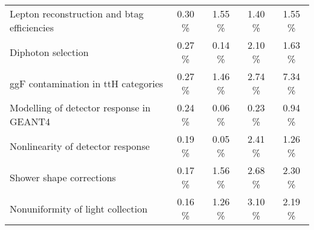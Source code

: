 {\begin{tabular} { |l |  c |  c |  c |  c |  }
    Lepton reconstruction and btag efficiencies  &  0.30 \% &  1.55 \% &  1.40 \% &  1.55 \% \\
    Diphoton selection  &  0.27 \% &  0.14 \% &  2.10 \% &  1.63 \% \\
    ggF contamination in ttH categories  &  0.27 \% &  1.46 \% &  2.74 \% &  7.34 \% \\
    Modelling of detector response in GEANT4  &  0.24 \% &  0.06 \% &  0.23 \% &  0.94 \% \\
    Nonlinearity of detector response  &  0.19 \% &  0.05 \% &  2.41 \% &  1.26 \% \\
    Shower shape corrections  &  0.17 \% &  1.56 \% &  2.68 \% &  2.30 \% \\
    Nonuniformity of light collection  &  0.16 \% &  1.26 \% &  3.10 \% &  2.19 \% \\
    \hline
    \end{tabular}}
